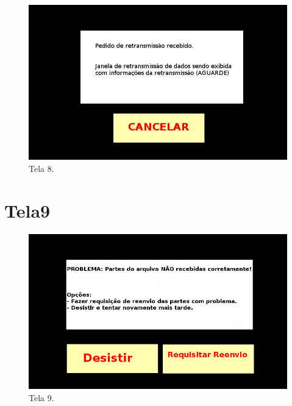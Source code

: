 \documentclass[11pt,a4paper]{article}
\begin{document}
\begin{figure}[H]
  \centering
  \hspace*{-1.5cm}
  \includegraphics[scale=0.7]{Tela8.png}
  \caption{Tela 8.}
  \label{Tela8}
\end{figure}

\section{Tela9}

\begin{figure}[H]
  \centering
  \hspace*{-1.5cm}
  \includegraphics[scale=0.7]{Tela9.png}
  \caption{Tela 9.}
  \label{Tela9}
\end{figure}
\end{document}

